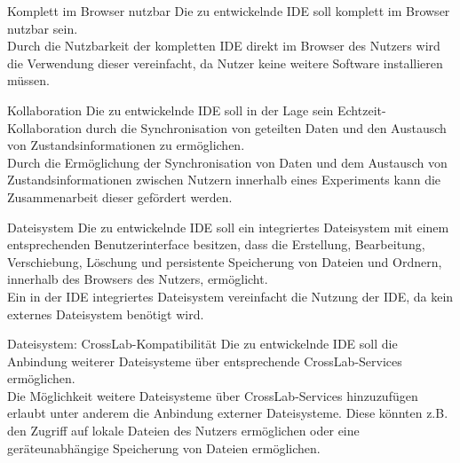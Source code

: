 \begin{requirement}{Komplett im Browser nutzbar}
    \reqdescription Die zu entwickelnde IDE soll komplett im Browser nutzbar sein. \\
    \reqrationale Durch die Nutzbarkeit der kompletten IDE direkt im Browser des Nutzers wird die Verwendung dieser vereinfacht, da Nutzer keine weitere Software installieren müssen. \\
\end{requirement}

\begin{requirement}{Kollaboration}
    \reqdescription Die zu entwickelnde IDE soll in der Lage sein Echtzeit-Kollaboration durch die Synchronisation von geteilten Daten und den Austausch von Zustandsinformationen zu ermöglichen. \\
    \reqrationale Durch die Ermöglichung der Synchronisation von Daten und dem Austausch von Zustandsinformationen zwischen Nutzern innerhalb eines Experiments kann die Zusammenarbeit dieser gefördert werden. \\
\end{requirement}

\begin{requirement}{Dateisystem}
    \reqdescription Die zu entwickelnde IDE soll ein integriertes Dateisystem mit einem entsprechenden Benutzerinterface besitzen, dass die Erstellung, Bearbeitung, Verschiebung, Löschung und persistente Speicherung von Dateien und Ordnern, innerhalb des Browsers des Nutzers, ermöglicht. \\
    \reqrationale Ein in der IDE integriertes Dateisystem vereinfacht die Nutzung der IDE, da kein externes Dateisystem benötigt wird. \\
\end{requirement}

\begin{requirement}{Dateisystem: CrossLab-Kompatibilität}
    \reqdescription Die zu entwickelnde IDE soll die Anbindung weiterer Dateisysteme über entsprechende CrossLab-Services ermöglichen. \\
    \reqrationale Die Möglichkeit weitere Dateisysteme über CrossLab-Services hinzuzufügen erlaubt unter anderem die Anbindung externer Dateisysteme. Diese könnten z.B. den Zugriff auf lokale Dateien des Nutzers ermöglichen oder eine geräteunabhängige Speicherung von Dateien ermöglichen. \\
\end{requirement}

